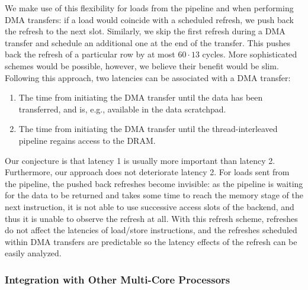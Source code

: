 We make use of this flexibility for loads from the pipeline and when performing DMA transfers:
if a load would coincide with a scheduled refresh, we push back the refresh to the next slot.
Similarly, we skip the first refresh during a DMA transfer and schedule an additional one at the end of the transfer.
This pushes back the refresh of a particular row by at most $60 \cdot 13$ cycles.
More sophisticated schemes would be possible, however, we believe their benefit would be slim.
Following this approach, two latencies can be associated with a DMA transfer:
\begin{enumerate}
  \item The time from initiating the DMA transfer until the data has been transferred, and is, e.g., available in the data scratchpad.
  \item The time from initiating the DMA transfer until the thread-interleaved pipeline regains access to the DRAM.
\end{enumerate}
Our conjecture is that latency 1 is usually more important than latency 2.
Furthermore, our approach does not deteriorate latency 2.
For loads sent from the pipeline, the pushed back refreshes become invisible:
as the pipeline is waiting for the data to be returned and takes some time to reach the memory stage of the next instruction, it is not able to use successive access slots of the backend, and thus it is unable to observe the refresh at all.
With this refresh scheme, refreshes do not affect the latencies of load/store instructions, and the refreshes scheduled within DMA transfers are predictable so the latency effects of the refresh can be easily analyzed.  

\subsubsection{Integration with Other Multi-Core Processors}

